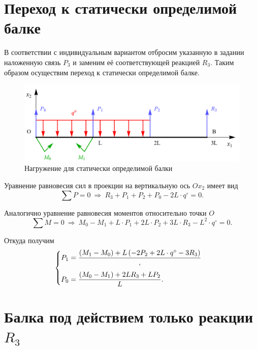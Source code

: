 \documentclass[12pt, a4paper]{article}
\begin{document}
	\section{Переход к статически определимой балке}
	
	В соответствии с индивидуальным вариантом отбросим указанную в задании наложенную связь $P_3$ и заменим её соответствующей реакцией $R_3$. Таким образом осуществим переход к статически определимой балке.
	
	\begin{figure}[!h]
		\centering
		\includegraphics[width=0.75\linewidth]{plot-3}
		\caption{Нагружение для статически определимой балки}
	\end{figure}
	
	\newpage
	
	Уравнение равновесия сил в проекции на вертикальную ось $Ox_2$ имеет вид
	\begin{equation*}
		\sum P = 0 \ \Rightarrow \ R_3 + P_1 + P_2 + P_0 - 2L \cdot q^{\circ} = 0.
	\end{equation*}
	
	Аналогично уравнение равновесия моментов относительно точки $O$
	\begin{equation*}
		\sum M = 0 \ \Rightarrow \ M_0 - M_1 + L \cdot P_1 + 2 L \cdot P_2 + 3 L \cdot R_3 - L^2 \cdot q^{\circ} = 0.
	\end{equation*}
	
	Откуда получим
	\begin{equation}
		\begin{cases} \vspace{0.75em}
			P_1 = \dfrac{\left( M_1 - M_0 \right)  + L\left(-2 P_2 + 2 L \cdot q^{\circ} - 3 R_3 \right)}, \\ 
			P_0 = \dfrac{\left( M_0 - M_1 \right) + 2 L R_3 + L P_2}{L}. \\
		\end{cases}
		\label{eqP0P1}
	\end{equation}
	
	\section{Балка под действием только реакции $R_3$}
	
\end{document}
